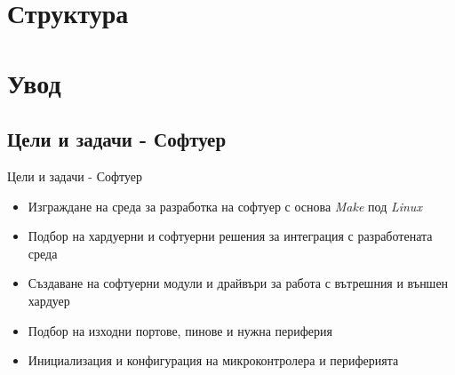 \documentclass[handout]{beamer}
\title{\documenttitle}
\subtitle{}
\author{\documentauthorname}
\institute{Технически Университет София}
\date{25 Февруари 2022}
\begin{document}
	
\begin{frame}
	\begin{nohyphens}
	\maketitle %
	\end{nohyphens}
\end{frame}

\section{Структура}
    
	
\begin{frame}
	\tableofcontents
\end{frame}


\section{Увод} 

\subsection{Цели и задачи - Софтуер}


\begin{frame}{Цели и задачи - Софтуер}
	\begin{itemize}
		\pause 
		\item Изграждане на среда за разработка на софтуер с основа \textit{Make} под \textit{Linux}

		\pause 
		\item Подбор на хардуерни и софтуерни решения за интеграция с разработената среда

		\pause 
		\item Създаване на софтуерни модули и драйвъри за работа с вътрешния и външен хардуер

		\pause 
		\item Подбор на изходни портове, пинове и нужна периферия

		\pause
		\item Инициализация и конфигурация на микроконтролера и периферията 

	\end{itemize}
\end{frame}
\end{document}
